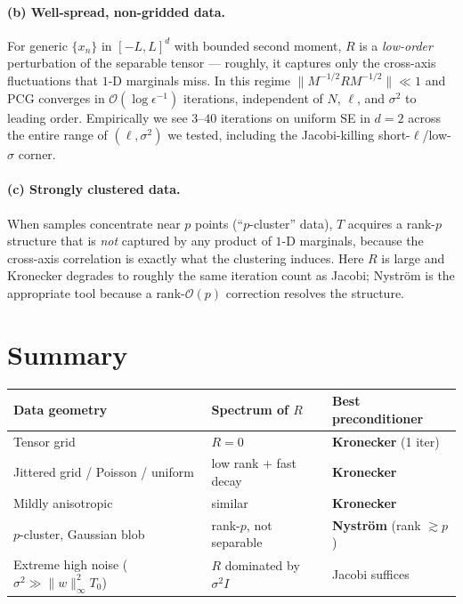 \documentclass[11pt]{article}
\newcommand{\bigo}{\mathcal{O}}
\begin{document}
\paragraph{(b) Well-spread, non-gridded data.}
For generic $\{x_n\}$ in $[-L,L]^d$ with bounded second moment, $R$ is a
\emph{low-order} perturbation of the separable tensor --- roughly, it
captures only the cross-axis fluctuations that $1$-D marginals miss. In
this regime $\|M^{-1/2} R M^{-1/2}\| \ll 1$ and PCG converges in
$\bigo(\log \epsilon^{-1})$ iterations, independent of $N$, $\ell$, and
$\sigma^2$ to leading order. Empirically we see $3$--$40$ iterations on
uniform SE in $d=2$ across the entire range of $(\ell,\sigma^2)$ we
tested, including the Jacobi-killing short-$\ell$/low-$\sigma$ corner.

\paragraph{(c) Strongly clustered data.}
When samples concentrate near $p$ points (``$p$-cluster'' data), $T$
acquires a rank-$p$ structure that is \emph{not} captured by any
product of $1$-D marginals, because the cross-axis correlation
is exactly what the clustering induces. Here $R$ is large and
Kronecker degrades to roughly the same iteration count as Jacobi;
Nystr\"{o}m is the appropriate tool because a rank-$\bigo(p)$
correction resolves the structure.

\section{Summary}

\begin{center}
\begin{tabular}{lll}
\toprule
\textbf{Data geometry} & \textbf{Spectrum of $R$} & \textbf{Best preconditioner}\\
\midrule
Tensor grid                       & $R = 0$                   & \textbf{Kronecker} (1 iter)\\
Jittered grid / Poisson / uniform & low rank + fast decay     & \textbf{Kronecker}\\
Mildly anisotropic                & similar                   & \textbf{Kronecker}\\
$p$-cluster, Gaussian blob        & rank-$p$, not separable   & \textbf{Nystr\"{o}m} (rank $\gtrsim p$)\\
Extreme high noise ($\sigma^2 \gg \|w\|_\infty^2 T_0$) & $R$ dominated by $\sigma^2 I$ & Jacobi suffices\\
\bottomrule
\end{tabular}
\end{center}
\end{document}
